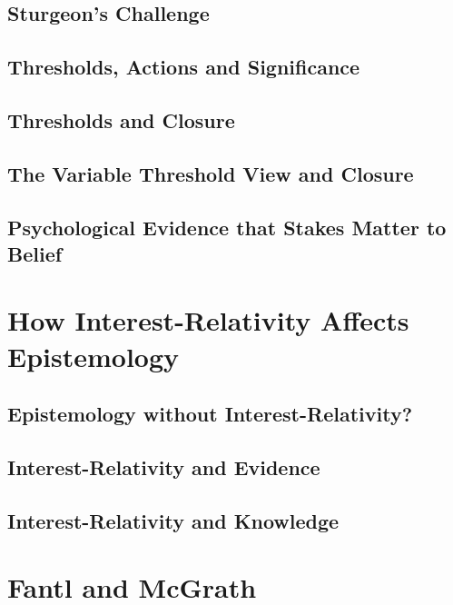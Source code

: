 \documentclass[oneside]{book}
\begin{document}
\section{Sturgeon's Challenge}

\section{Thresholds, Actions and Significance}



\section{Thresholds and Closure}



\section{The Variable Threshold View and Closure}



\section{Psychological Evidence that Stakes Matter to Belief}

\chapter{How Interest-Relativity Affects Epistemology}

\section{Epistemology without Interest-Relativity?}

\section{Interest-Relativity and Evidence}

\section{Interest-Relativity and Knowledge}

\chapter{Fantl and McGrath}
\end{document}
